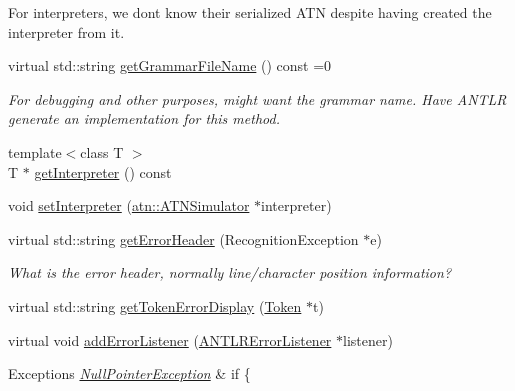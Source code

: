 \begin{DoxyCompactItemize}
\begin{DoxyCompactList}
For interpreters, we don\textquotesingle{}t know their serialized A\+TN despite having created the interpreter from it. \end{DoxyCompactList}\item 
virtual std\+::string \hyperlink{classantlr4_1_1Recognizer_a41d77f1ad38c68b4208d26c070fd2cc7}{get\+Grammar\+File\+Name} () const =0
\begin{DoxyCompactList}\small\item\em For debugging and other purposes, might want the grammar name. Have A\+N\+T\+LR generate an implementation for this method. \end{DoxyCompactList}\item 
{\footnotesize template$<$class T $>$ }\\T $\ast$ \hyperlink{classantlr4_1_1Recognizer_a926f7b518ef08afd27eb9ab1af2e2757}{get\+Interpreter} () const
\item 
void \hyperlink{classantlr4_1_1Recognizer_a8f7a89b06fda4ea78ac341c812f80551}{set\+Interpreter} (\hyperlink{classantlr4_1_1atn_1_1ATNSimulator}{atn\+::\+A\+T\+N\+Simulator} $\ast$interpreter)
\item 
\mbox{\label{classantlr4_1_1Recognizer_a384c82256aef360f6cd58f289b592184}} 
virtual std\+::string \hyperlink{classantlr4_1_1Recognizer_a384c82256aef360f6cd58f289b592184}{get\+Error\+Header} (Recognition\+Exception $\ast$e)
\begin{DoxyCompactList}\small\item\em What is the error header, normally line/character position information? \end{DoxyCompactList}\item 
virtual std\+::string \hyperlink{classantlr4_1_1Recognizer_a4f7740ffef4e68ea219a3f3103281e1d}{get\+Token\+Error\+Display} (\hyperlink{classantlr4_1_1Token}{Token} $\ast$t)
\item 
virtual void \hyperlink{classantlr4_1_1Recognizer_a318b28305ce27bd8a6737d994c58cd71}{add\+Error\+Listener} (\hyperlink{classantlr4_1_1ANTLRErrorListener}{A\+N\+T\+L\+R\+Error\+Listener} $\ast$listener)
\begin{DoxyCompactList}\small\item\em 
\begin{DoxyExceptions}{Exceptions}
{\em \hyperlink{classantlr4_1_1NullPointerException}{Null\+Pointer\+Exception}} & if \{ \\
\hline
\end{DoxyExceptions}
\end{DoxyCompactList}\item 

\end{DoxyCompactItemize}
